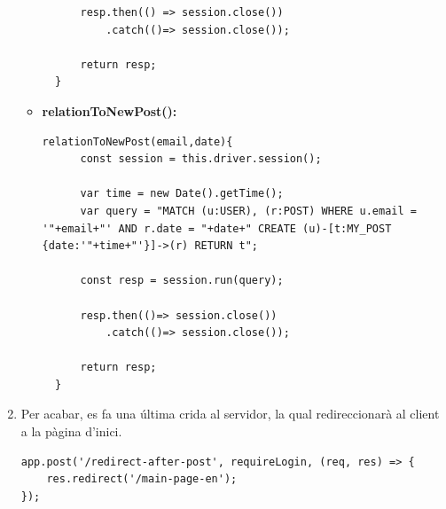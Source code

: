 \documentclass[11pt,catalan,listoffigures,listoftables]{tfgetsinf}
\begin{document}
\begin{enumerate}
\begin{itemize}
\begin{lstlisting}
      resp.then(() => session.close())
          .catch(()=> session.close());

      return resp;
  }
\end{lstlisting}
\item \textbf{relationToNewPost():}
\begin{lstlisting}
relationToNewPost(email,date){
      const session = this.driver.session();

      var time = new Date().getTime();
      var query = "MATCH (u:USER), (r:POST) WHERE u.email = '"+email+"' AND r.date = "+date+" CREATE (u)-[t:MY_POST {date:'"+time+"'}]->(r) RETURN t";

      const resp = session.run(query);

      resp.then(()=> session.close())
          .catch(()=> session.close());

      return resp;
  }
\end{lstlisting}
\end{itemize}
\item Per acabar, es fa una última crida al servidor, la qual redireccionarà al client a la pàgina d'inici.
\begin{lstlisting}
app.post('/redirect-after-post', requireLogin, (req, res) => {
    res.redirect('/main-page-en');
});
\end{lstlisting}
\end{enumerate}
\newpage
\end{document}
